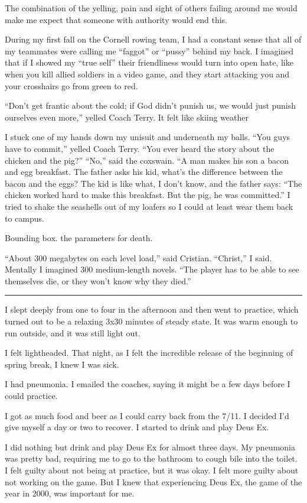 The combination of the yelling, pain and sight of others failing around me would
make me expect that someone with authority would end this.

During my first fall on the Cornell rowing team, I had a constant sense that
all of my teammates were calling me ``faggot'' or ``pussy'' behind my back.  I
imagined that if I showed my ``true self'' their friendliness would turn into
open hate, like when you kill allied soldiers in a video game, and they start
attacking you and your crosshairs go from green to red.  

``Don't get frantic about the cold; if God didn't punish us, we would just
punish ourselves even more,'' yelled Coach Terry.  It felt like skiing weather

I stuck one of my hands down my unisuit and underneath my balls.  ``You guys
have to commit,'' yelled Coach Terry.  ``You ever heard the story about the
chicken and the pig?'' ``No,'' said the coxswain.  ``A man makes his son a bacon
and egg breakfast.  The father asks his kid, what's the difference between the
bacon and the eggs?  The kid is like what, I don't know, and the father says:
``The chicken worked hard to make this breakfast.  But the pig, he was
committed.'' I tried to shake the seashells out of my loafers so I could at
least wear them back to campus. 

Bounding box.  the parameters for death.

``About 300 megabytes on each level load,'' said Cristian.  ``Christ,'' I said.
Mentally I imagined 300 medium-length novels.  ``The player has to be able to
see themselves die, or they won't know why they died.'' 

\plainfancybreak{12pt}{2}{* * *}

I slept deeply from one to four in the afternoon and then went to practice,
which turned out to be a relaxing 3x30 minutes of steady state.  It was warm
enough to run outside, and it was still light out.

I felt lightheaded.  That night, as I felt the incredible release of the
beginning of spring break, I knew I was sick.  

I had pneumonia.  I emailed the coaches, saying it might be a few days before I
could practice.

I got as much food and beer as I could carry back from the 7/11.  I decided I'd
give myself a day or two to recover.  I started to drink and play Deus Ex.  

I did nothing but drink and play Deus Ex for almost three days.  My pneumonia
was pretty bad, requiring me to go to the bathroom to cough bile into the
toilet.  I felt guilty about not being at practice, but it was okay.  I felt
more guilty about not working on the game.  But I knew that experiencing Deus
Ex, the game of the year in 2000, was important for me.

